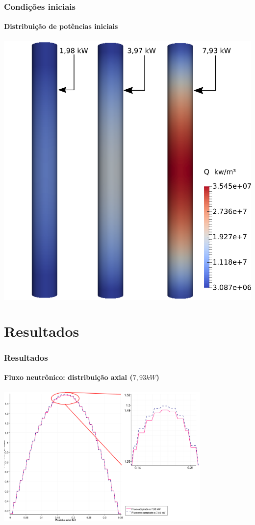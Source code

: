 \documentclass[svgnames,smaller,table]{beamer}
\begin{document}
\begin{frame}
  \frametitle{Condições iniciais}
  \framesubtitle{Distribuição de potências iniciais}
  \centering\includegraphics[scale=0.4]{../figuras/Q_fuel_all_NC.png}
\end{frame}

\section{Resultados}
\begin{frame}
  \frametitle{Resultados}
  \framesubtitle{Fluxo neutrônico: distribuição axial ($7,93 kW$)}
  \centering\includegraphics[width=\textwidth, height=7.0cm]{../figuras/Flux_rel_z_200_port_trabalhado.png}
  \label{fig:flux200z}
\end{frame}
\end{document}
